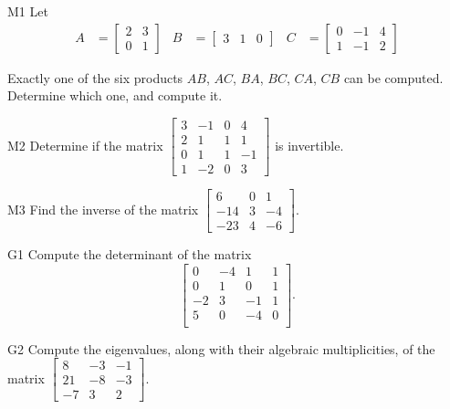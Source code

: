 \documentclass{sbgLAexam}
\begin{document}
\begin{problem}{M1}
Let
\begin{align*}
A &= \begin{bmatrix} 2 & 3 \\ 0 & 1 \end{bmatrix} & B&= \begin{bmatrix} 3 & 1 & 0 \end{bmatrix} & C&= \begin{bmatrix} 0 & -1 & 4 \\ 1 & -1 & 2 \end{bmatrix}
\end{align*}

Exactly one of the six products $AB$, $AC$, $BA$, $BC$, $CA$, $CB$ can be computed.  Determine which one, and compute it.
\end{problem}

\begin{problem}{M2}
Determine if the matrix $\begin{bmatrix} 3 & -1 & 0 & 4 \\ 2 & 1 & 1 & 1 \\ 0 & 1 & 1 & -1 \\ 1 & -2 & 0 & 3 \end{bmatrix}$ is invertible.
\end{problem}
\newpage

\begin{problem}{M3} Find the inverse of the matrix $\begin{bmatrix} 6 & 0 & 1 \\ -14 & 3 & -4 \\ -23 & 4 & -6\end{bmatrix}$.
\end{problem}

\begin{problem}{G1}
Compute the determinant of the matrix
\[
  \begin{bmatrix}
    0 & -4 & 1 & 1 \\
    0 & 1 & 0 & 1 \\
    -2 & 3 & -1 & 1 \\
    5 & 0 & -4 & 0 \\
  \end{bmatrix}
.\]
\end{problem}
\newpage

\begin{problem}{G2}
Compute the eigenvalues, along with their algebraic multiplicities, of the matrix $ \begin{bmatrix} 8 & -3 & -1 \\ 21 & -8 & -3 \\ -7 & 3 & 2\end{bmatrix}$.
\end{problem}
\end{document}
